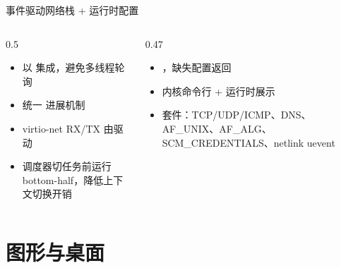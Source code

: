 \documentclass[aspectratio=1610]{beamer}
\begin{document}
\begin{frame}{事件驱动网络栈 + 运行时配置}
    \begin{columns}[t]
        \begin{column}{0.5\textwidth}
            \begin{itemize}
                \item {} 以  集成，避免多线程轮询
                \item {} 统一  进展机制
                \item virtio-net RX/TX 由驱动
                \item 调度器切任务前运行 bottom-half，降低上下文切换开销
            \end{itemize}
            \vspace{0.2em}
        \end{column}
        \begin{column}{0.47\textwidth}
            \begin{itemize}
                \item {}，缺失配置返回 
                \item 内核命令行  +  运行时展示
                \item 套件：TCP/UDP/ICMP、DNS、AF\_UNIX、AF\_ALG、SCM\_CREDENTIALS、netlink uevent
            \end{itemize}
            \vspace{0.2em}
        \end{column}
    \end{columns}
\end{frame}

\renewcommand{\azsectionsummary}{%
    内核原生 DRM/KMS + evdev 支撑 Weston / labwc Wayland 桌面与 LVGL 自研桌面；%
    virtio-gpu virgl 打通 3D 命令透传链路。}
\section{图形与桌面}
\end{document}
